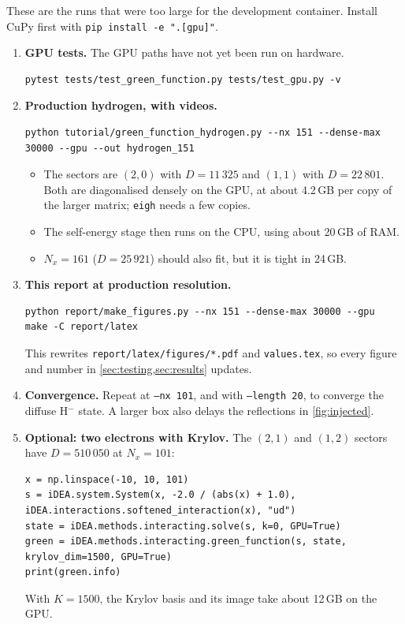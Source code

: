 \documentclass[11pt,a4paper]{article}
\newcommand{\code}[1]{\texttt{#1}}
\newcommand{\Nx}{N_x}
\begin{document}
These are the runs that were too large for the development container. Install CuPy first with \code{pip install -e ".[gpu]"}.

\begin{enumerate}
\item \textbf{GPU tests.} The GPU paths have not yet been run on hardware.
\begin{lstlisting}
pytest tests/test_green_function.py tests/test_gpu.py -v
\end{lstlisting}
\item \textbf{Production hydrogen, with videos.}
\begin{lstlisting}
python tutorial/green_function_hydrogen.py --nx 151 --dense-max 30000 --gpu --out hydrogen_151
\end{lstlisting}
\begin{itemize}
\item The sectors are $(2,0)$ with $D=11\,325$ and $(1,1)$ with $D=22\,801$. Both are diagonalised densely on the GPU, at about 4.2\,GB per copy of the larger matrix; \code{eigh} needs a few copies.
\item The self-energy stage then runs on the CPU, using about 20\,GB of RAM.
\item $\Nx=161$ ($D=25\,921$) should also fit, but it is tight in 24\,GB.
\end{itemize}
\item \textbf{This report at production resolution.}
\begin{lstlisting}
python report/make_figures.py --nx 151 --dense-max 30000 --gpu
make -C report/latex
\end{lstlisting}
This rewrites \code{report/latex/figures/*.pdf} and \code{values.tex}, so every figure and number in \cref{sec:testing,sec:results} updates.
\item \textbf{Convergence.} Repeat at \code{--nx 101}, and with \code{--length 20}, to converge the diffuse H$^-$ state. A larger box also delays the reflections in \cref{fig:injected}.
\item \textbf{Optional: two electrons with Krylov.} The $(2,1)$ and $(1,2)$ sectors have $D=510\,050$ at $\Nx=101$:
\begin{lstlisting}[style=python]
x = np.linspace(-10, 10, 101)
s = iDEA.system.System(x, -2.0 / (abs(x) + 1.0), iDEA.interactions.softened_interaction(x), "ud")
state = iDEA.methods.interacting.solve(s, k=0, GPU=True)
green = iDEA.methods.interacting.green_function(s, state, krylov_dim=1500, GPU=True)
print(green.info)
\end{lstlisting}
With $K=1500$, the Krylov basis and its image take about 12\,GB on the GPU.
\end{enumerate}
\end{document}
